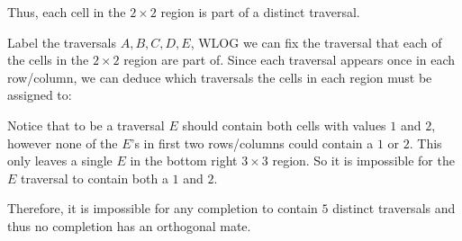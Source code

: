 \documentclass[a4paper, 11pt]{article}
\begin{document}
\begin{enumerate}[label=(\alph*)]
\begin{mdframed}
		Thus, each cell in the $2\times 2$ region is part of a distinct traversal. 
	\end{mdframed}

	Label the traversals $A,B,C,D,E$, WLOG we can fix the traversal that each of the cells in the $2\times 2$ region are part of. Since each traversal appears once in each row/column, we can deduce which traversals the cells in each region must be assigned to: 

	\vspace{1em}

	\hfill{}\hfill\vspace{0pt}\begin{minipage}[b]{0.5\textwidth}
		Notice that to be a traversal $E$ should contain both cells with values $1$ and $2$, however none of the $E$'s in first two rows/columns could contain a $1$ or $2$. This only leaves a single $E$ in the bottom right $3\times3$ region. So it is impossible for the $E$ traversal to contain both a $1$ and $2$. 

		\vspace{1em}
		
		Therefore, it is impossible for any completion to contain $5$ distinct traversals and thus no completion has an orthogonal mate. 

		\vspace{1em}
	\end{minipage}
	
	






\end{enumerate}
\end{document}
